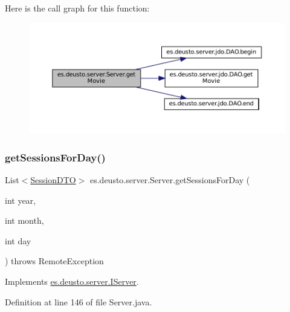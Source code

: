 Here is the call graph for this function\+:
\nopagebreak
\begin{figure}[H]
\begin{center}
\leavevmode
\includegraphics[width=350pt]{classes_1_1deusto_1_1server_1_1_server_a7e4544c63bcf2b2d3abce0d2ff1567ac_cgraph}
\end{center}
\end{figure}
\mbox{\label{classes_1_1deusto_1_1server_1_1_server_a688ca336b3cbdb5c04ecdc4f23ff65d1}} 
\subsubsection{\texorpdfstring{getSessionsForDay()}{getSessionsForDay()}}
{\footnotesize\ttfamily List$<$\mbox{\hyperlink{classes_1_1deusto_1_1server_1_1data_1_1_session_d_t_o}{Session\+D\+TO}}$>$ es.\+deusto.\+server.\+Server.\+get\+Sessions\+For\+Day (\begin{DoxyParamCaption}\item[{int}]{year,  }\item[{int}]{month,  }\item[{int}]{day }\end{DoxyParamCaption}) throws Remote\+Exception}



Implements \mbox{\hyperlink{interfacees_1_1deusto_1_1server_1_1_i_server_aac50d6a77e30df4d4c15fcaf4ba979f5}{es.\+deusto.\+server.\+I\+Server}}.



Definition at line 146 of file Server.\+java.

